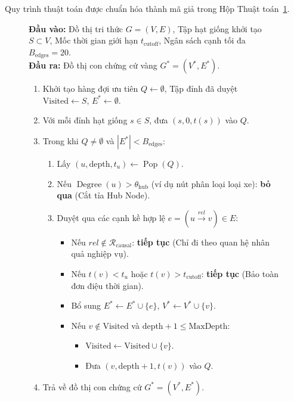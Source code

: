 \documentclass[a4paper,11pt]{article}
\begin{document}
Quy trình thuật toán được chuẩn hóa thành mã giả trong Hộp Thuật toán~\ref{box:directed-kg-alg}.

\begin{figure}[htbp]
\centering
\begin{tcolorbox}[
    colback=codebg, colframe=brandblue, width=\textwidth,
    title={\small\bfseries\color{white} THUẬT TOÁN 2: DUYỆT ĐỒ THỊ CÓ HƯỚNG ĐA CHẶNG BẢO TOÀN NHÂN QUẢ (CAUSAL KG TRAVERSAL)},
    fonttitle=\bfseries
]
\small
\textbf{Đầu vào:} Đồ thị tri thức $G=(V, E)$, Tập hạt giống khởi tạo $S \subset V$, Mốc thời gian giới hạn $t_{\text{cutoff}}$, Ngân sách cạnh tối đa $B_{\text{edges}} = 20$.\\
\textbf{Đầu ra:} Đồ thị con chứng cứ vàng $G^* = (V^*, E^*)$.
\begin{enumerate}[noitemsep,topsep=2pt]
    \item Khởi tạo hàng đợi ưu tiên $Q \leftarrow \emptyset$, Tập đỉnh đã duyệt $\text{Visited} \leftarrow S$, $E^* \leftarrow \emptyset$.
    \item Với mỗi đỉnh hạt giống $s \in S$, đưa $(s, 0, t(s))$ vào $Q$.
    \item Trong khi $Q \ne \emptyset$ và $|E^*| < B_{\text{edges}}$:
    \begin{enumerate}[noitemsep]
        \item Lấy $(u, \text{depth}, t_u) \leftarrow \operatorname{Pop}(Q)$.
        \item Nếu $\operatorname{Degree}(u) > \theta_{\text{hub}}$ (ví dụ nút phân loại loại xe): \textbf{bỏ qua} (Cắt tỉa Hub Node).
        \item Duyệt qua các cạnh kề hợp lệ $e = (u \xrightarrow{rel} v) \in E$:
        \begin{itemize}[noitemsep]
            \item Nếu $rel \notin \mathcal{R}_{\text{causal}}$: \textbf{tiếp tục} (Chỉ đi theo quan hệ nhân quả nghiệp vụ).
            \item Nếu $t(v) < t_u$ hoặc $t(v) > t_{\text{cutoff}}$: \textbf{tiếp tục} (Bảo toàn đơn điệu thời gian).
            \item Bổ sung $E^* \leftarrow E^* \cup \{e\}$, $V^* \leftarrow V^* \cup \{v\}$.
            \item Nếu $v \notin \text{Visited}$ và $\text{depth} + 1 \le \text{MaxDepth}$:
            \begin{itemize}[noitemsep]
                \item $\text{Visited} \leftarrow \text{Visited} \cup \{v\}$.
                \item Đưa $(v, \text{depth} + 1, t(v))$ vào $Q$.
            \end{itemize}
        \end{itemize}
    \end{enumerate}
    \item Trả về đồ thị con chứng cứ $G^* = (V^*, E^*)$.
\end{enumerate}
\end{tcolorbox}
\label{box:directed-kg-alg}
\end{figure}
\end{document}
